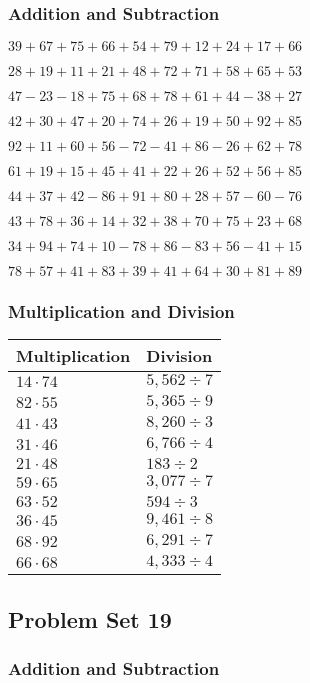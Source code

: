 \hypertarget{addition-and-subtraction-58}{%
\subsubsection{Addition and
Subtraction}\label{addition-and-subtraction-58}}

\(39+67+75+66+54+79+12+24+17+ 66\)

\(28+19+11+21+48+72+71+58+65+53\)

\(47-23-18+75+68+78+61+44-38+27\)

\(42+30+47+20+74+26+19+50+92+85\)

\(92+11+60+56-72-41+86-26+62+78\)

\(61+19+15+45+41+22+26+52+56+85\)

\(44+37+42-86+91+80+28+57-60-76\)

\(43+78+36+14+32+38+70+75+23+68\)

\(34+94+74+10-78+86-83+56-41+15\)

\(78+57+41+83+39+41+64+30+81+89\)

\hypertarget{multiplication-and-division-58}{%
\subsubsection{Multiplication and
Division}\label{multiplication-and-division-58}}

\begin{longtable}[]{@{}ll@{}}
\toprule
Multiplication & Division\tabularnewline
\midrule
\endhead
\(14\cdot74\) & \(5,562÷7\)\tabularnewline
\(82\cdot55\) & \(5,365÷9\)\tabularnewline
\(41\cdot43\) & \(8,260÷3\)\tabularnewline
\(31\cdot46\) & \(6,766÷4\)\tabularnewline
\(21\cdot48\) & \(183÷2\)\tabularnewline
\(59\cdot65\) & \(3,077÷7\)\tabularnewline
\(63\cdot52\) & \(594÷3\)\tabularnewline
\(36\cdot45\) & \(9,461÷8\)\tabularnewline
\(68\cdot92\) & \(6,291÷7\)\tabularnewline
\(66\cdot68\) & \(4,333÷4\)\tabularnewline
\bottomrule
\end{longtable}

\hypertarget{problem-set-19-1}{%
\subsection{Problem Set 19}\label{problem-set-19-1}}

\hypertarget{addition-and-subtraction-59}{%
\subsubsection{Addition and
Subtraction}\label{addition-and-subtraction-59}}


